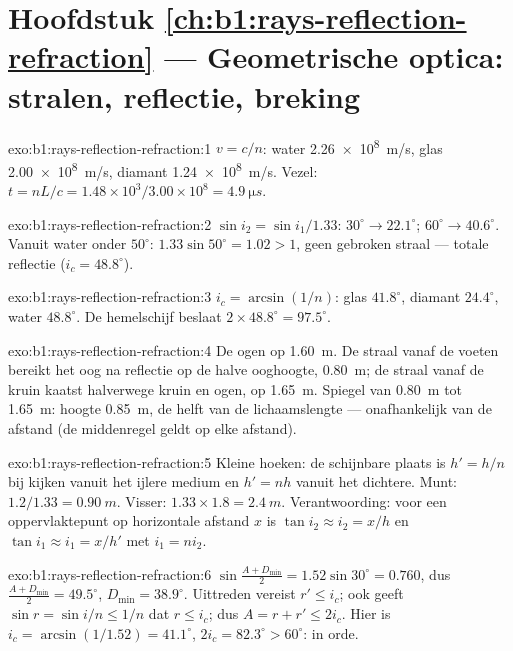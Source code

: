 \section*{Hoofdstuk \ref{ch:b1:rays-reflection-refraction} --- Geometrische optica: stralen, reflectie, breking}

\begin{solution}{exo:b1:rays-reflection-refraction:1}
$v = c/n$: water \qty{2.26e8}{m/s}, glas \qty{2.00e8}{m/s}, diamant
\qty{1.24e8}{m/s}. Vezel: $t = nL/c = 1.48 \times 10^3/3.00\times10^8 =
\qty{4.9}{\micro s}$.
\end{solution}

\begin{solution}{exo:b1:rays-reflection-refraction:2}
$\sin i_2 = \sin i_1/1.33$: $30^\circ \to 22.1^\circ$; $60^\circ \to
40.6^\circ$. Vanuit water onder $50^\circ$: $1.33\sin 50^\circ = 1.02 > 1$,
geen gebroken straal --- totale reflectie ($i_c = 48.8^\circ$).
\end{solution}

\begin{solution}{exo:b1:rays-reflection-refraction:3}
$i_c = \arcsin(1/n)$: glas $41.8^\circ$, diamant $24.4^\circ$, water
$48.8^\circ$. De hemelschijf beslaat $2 \times 48.8^\circ = 97.5^\circ$.
\end{solution}

\begin{solution}{exo:b1:rays-reflection-refraction:4}
De ogen op \qty{1.60}{m}. De straal vanaf de voeten bereikt het oog na
reflectie op de halve ooghoogte, \qty{0.80}{m}; de straal vanaf de kruin
kaatst halverwege kruin en ogen, op \qty{1.65}{m}.
Spiegel van \qty{0.80}{m} tot \qty{1.65}{m}: hoogte \qty{0.85}{m}, de helft
van de lichaamslengte --- onafhankelijk van de afstand (de middenregel geldt
op elke afstand).
\end{solution}

\begin{solution}{exo:b1:rays-reflection-refraction:5}
Kleine hoeken: de schijnbare plaats is $h' = h/n$ bij kijken vanuit het
ijlere medium en $h' = nh$ vanuit het dichtere. Munt: $1.2/1.33 =
\qty{0.90}{m}$. Visser: $1.33 \times 1.8 = \qty{2.4}{m}$. Verantwoording:
voor een oppervlaktepunt op horizontale afstand $x$ is $\tan i_2 \approx i_2 =
x/h$ en $\tan i_1 \approx i_1 = x/h'$ met $i_1 = n i_2$.
\end{solution}

\begin{solution}{exo:b1:rays-reflection-refraction:6}
$\sin\frac{A + D_{\min}}{2} = 1.52\sin 30^\circ = 0.760$, dus
$\frac{A + D_{\min}}{2} = 49.5^\circ$, $D_{\min} = 38.9^\circ$.
Uittreden vereist $r' \leq i_c$; ook geeft $\sin r = \sin i/n \leq 1/n$ dat
$r \leq i_c$; dus $A = r + r' \leq 2i_c$. Hier is $i_c = \arcsin(1/1.52) =
41.1^\circ$, $2i_c = 82.3^\circ > 60^\circ$: in orde.
\end{solution}

